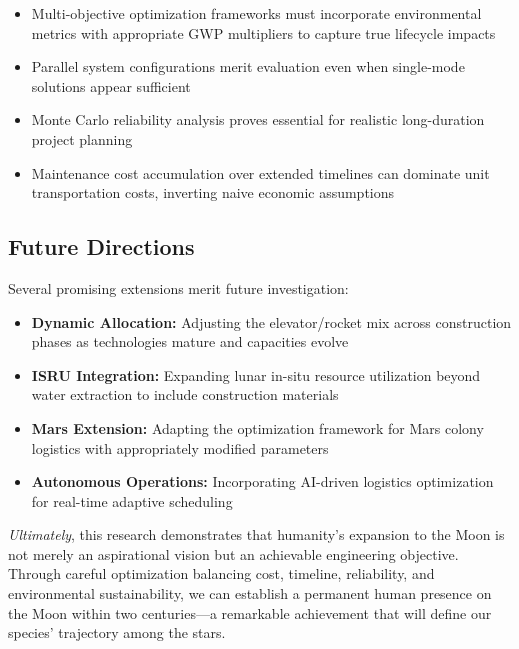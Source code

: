 \documentclass[12pt]{article}
\begin{document}
\begin{itemize}[leftmargin=2em]
	\item Multi-objective optimization frameworks must incorporate environmental metrics with appropriate GWP multipliers to capture true lifecycle impacts
	\item Parallel system configurations merit evaluation even when single-mode solutions appear sufficient
	\item Monte Carlo reliability analysis proves essential for realistic long-duration project planning
	\item Maintenance cost accumulation over extended timelines can dominate unit transportation costs, inverting naive economic assumptions
\end{itemize}

\subsection{Future Directions}

Several promising extensions merit future investigation:

\begin{itemize}[leftmargin=2em]
	\item \textbf{Dynamic Allocation:} Adjusting the elevator/rocket mix across construction phases as technologies mature and capacities evolve
	\item \textbf{ISRU Integration:} Expanding lunar in-situ resource utilization beyond water extraction to include construction materials
	\item \textbf{Mars Extension:} Adapting the optimization framework for Mars colony logistics with appropriately modified parameters
	\item \textbf{Autonomous Operations:} Incorporating AI-driven logistics optimization for real-time adaptive scheduling
\end{itemize}

\textit{Ultimately}, this research demonstrates that humanity's expansion to the Moon is not merely an aspirational vision but an achievable engineering objective. Through careful optimization balancing cost, timeline, reliability, and environmental sustainability, we can establish a permanent human presence on the Moon within two centuries---a remarkable achievement that will define our species' trajectory among the stars.
	
\end{document}
